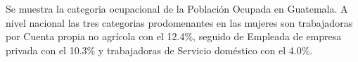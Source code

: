 Se muestra la categoria ocupacional de la Población Ocupada en Guatemala. A nivel nacional las tres categorias prodomenantes en las mujeres son trabajadoras por Cuenta propia no agrícola con el 12.4\%, seguido de Empleada de empresa privada con el 10.3\% y trabajadoras de Servicio doméstico con el 4.0\%.
